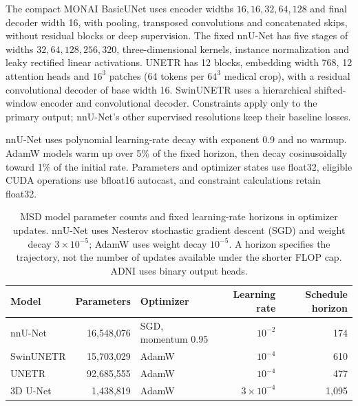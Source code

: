 \documentclass[12pt,a4paper]{article}
\begin{document}
The compact MONAI BasicUNet uses encoder widths $16,16,32,64,128$
and final decoder width 16, with pooling, transposed convolutions and
concatenated skips, without residual blocks or deep supervision.
The fixed nnU-Net has five stages of widths $32,64,128,256,320$,
three-dimensional kernels, instance normalization and leaky rectified
linear activations. UNETR has 12 blocks, embedding width 768, 12
attention heads and $16^3$ patches (64 tokens per $64^3$ medical crop),
with a residual convolutional decoder of base width 16. SwinUNETR
uses a hierarchical shifted-window encoder and convolutional decoder.
Constraints apply only to the primary output; nnU-Net's other supervised
resolutions keep their baseline losses.

nnU-Net uses polynomial learning-rate decay with exponent 0.9 and no
warmup. AdamW models warm up over 5\% of the fixed horizon, then decay
cosinusoidally toward 1\% of the initial rate. Parameters and optimizer
states use float32, eligible CUDA operations use bfloat16 autocast,
and constraint calculations retain float32.

\begin{table}[htbp]
\centering\small{}
\begin{tabular}{@{}P{2.5cm}rP{3.0cm}rr@{}}
\hline
Model & Parameters & Optimizer & Learning rate & Schedule horizon \\
\hline
nnU-Net & 16,548,076 & SGD, momentum 0.95 & $10^{-2}$ & 174 \\
SwinUNETR & 15,703,029 & AdamW & $10^{-4}$ & 610 \\
UNETR & 92,685,555 & AdamW & $10^{-4}$ & 477 \\
3D U-Net & 1,438,819 & AdamW & $3\times10^{-4}$ & 1,095 \\
\hline
\end{tabular}
\caption{MSD model parameter counts and fixed learning-rate horizons in optimizer
updates. nnU-Net uses Nesterov stochastic gradient descent (SGD) and weight decay $3\times10^{-5}$;
AdamW uses weight decay $10^{-5}$. A horizon specifies the trajectory,
not the number of updates available under the shorter FLOP cap. ADNI
uses binary output heads.}
\label{tab:main-model-settings}
\end{table}
\end{document}
